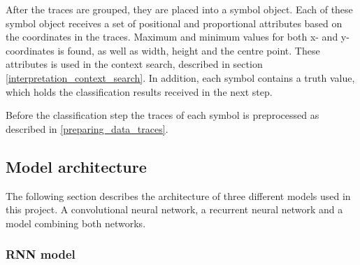 After the traces are grouped, they are placed into a symbol object. Each of these symbol object receives a set of positional and proportional attributes based on the coordinates in the traces. Maximum and minimum values for both x- and y-coordinates is found, as well as width, height and the centre point. These attributes is used in the context search, described in section \ref{interpretation_context_search}. In addition, each symbol contains a truth value, which holds the classification results received in the next step.

Before the classification step the traces of each symbol is preprocessed as described in \ref{preparing_data_traces}. 


\subsection{Model architecture} 

The following section describes the architecture of three different models used in this project. A convolutional neural network, a recurrent neural network and a model combining both networks.

\subsubsection{RNN model}

